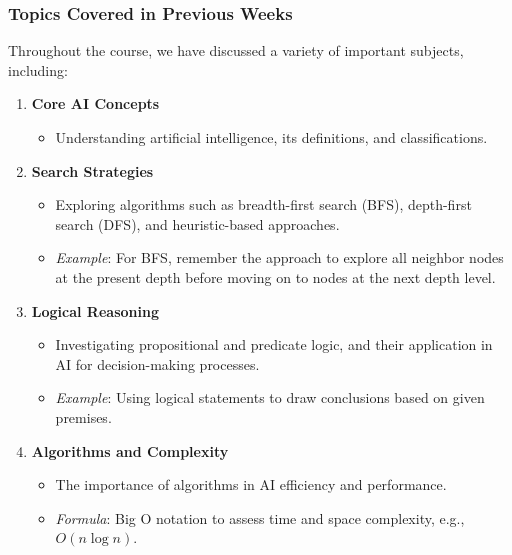 \documentclass[aspectratio=169]{beamer}
\begin{document}
\begin{frame}[fragile]
    \frametitle{Topics Covered in Previous Weeks}
    Throughout the course, we have discussed a variety of important subjects, including:

    \begin{enumerate}
        \item \textbf{Core AI Concepts}
        \begin{itemize}
            \item Understanding artificial intelligence, its definitions, and classifications.
        \end{itemize}

        \item \textbf{Search Strategies}
        \begin{itemize}
            \item Exploring algorithms such as breadth-first search (BFS), depth-first search (DFS), and heuristic-based approaches.
            \item \textit{Example}: For BFS, remember the approach to explore all neighbor nodes at the present depth before moving on to nodes at the next depth level.
        \end{itemize}

        \item \textbf{Logical Reasoning}
        \begin{itemize}
            \item Investigating propositional and predicate logic, and their application in AI for decision-making processes.
            \item \textit{Example}: Using logical statements to draw conclusions based on given premises.
        \end{itemize}

        \item \textbf{Algorithms and Complexity}
        \begin{itemize}
            \item The importance of algorithms in AI efficiency and performance.
            \item \textit{Formula}: Big O notation to assess time and space complexity, e.g., $O(n \log n)$.
        \end{itemize}
    \end{enumerate}
\end{frame}
\end{document}
